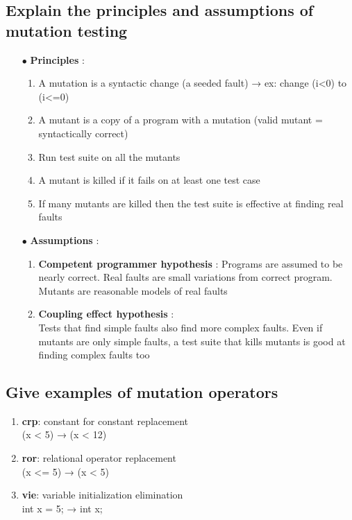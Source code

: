 \documentclass{article}
\begin{document}
\subsection{Explain the principles and assumptions of mutation testing}
\vspace{-0.5cm}
\begin{multicols}{2}
\begin{itemize}
    \item [$\bullet$]\textbf{Principles} :
    \begin{enumerate}
        \item A mutation is a syntactic change (a seeded fault) → ex: change (i<0) to (i<=0)

        \item A mutant is a copy of a program with a mutation (valid mutant = syntactically correct)
        \item Run test suite on all the mutants
        \item A mutant is killed if it fails on at least one test case
        \item If many mutants are killed then the test suite is effective at finding real faults
    \end{enumerate}
    
    \vfill\null\columnbreak
    \item [$\bullet$]\textbf{Assumptions} :
    \begin{enumerate}
        \item \textbf{Competent programmer hypothesis} : Programs are assumed to be nearly correct. Real faults are small variations from correct program. Mutants are reasonable models of real faults

        \item \textbf{Coupling effect hypothesis} : \\Tests that find simple faults also find more complex faults. Even if mutants are only simple faults, a test suite that kills mutants is good at finding complex faults too
    \end{enumerate}
    \vfill\null
\end{itemize}
\end{multicols}
\vspace{-0.5cm}
\subsection{Give examples of mutation operators}
\begin{enumerate}
    \item \textbf{crp}: constant for constant replacement\\
(x < 5) → (x < 12)
    \item \textbf{ror}: relational operator replacement\\
(x <= 5) → (x < 5)
    \item \textbf{vie}: variable initialization elimination\\
int x = 5; → int x;
\end{enumerate}
\end{document}
